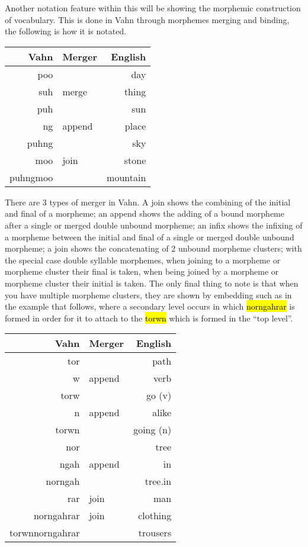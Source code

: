 \documentclass{article}
\newcommand{\hlv}[2][gray]{ {\sethlcolor{#1} \hl{#2}} }
\begin{document}
Another notation feature within this will be showing the morphemic construction of vocabulary. This is done in Vahn through morphemes merging and binding, the following is how it is notated.

\begin{table}[H]
\centering
\begin{tabular}{r|l||r}
Vahn     & Merger & English  \\
\hline\hline
poo      &        & day      \\
suh      & merge  & thing    \\
\hline
puh      &        & sun      \\
ng       & append & place    \\
\hline
puhng    &        & sky      \\
moo      & join   & stone    \\
\hline \hline
puhngmoo &        & mountain
\end{tabular}
\end{table}

There are 3 types of merger in Vahn. A join shows the combining of the initial and final of a morpheme; an append shows the adding of a bound morpheme after a single or merged double unbound morpheme; an infix shows the infixing of a morpheme between the initial and final of a single or merged double unbound morpheme; a join shows the concatenating of 2 unbound morpheme clusters; with the special case double syllable morphemes, when joining to a morpheme or morpheme cluster their final is taken, when being joined by a morpheme or morpheme cluster their initial is taken. The only final thing to note is that when you have multiple morpheme clusters, they are shown by embedding such as in the example that follows, where a secondary level occurs in which \hlv{norngahrar} is formed in order for it to attach to the \hlv{torwn} which is formed in the ``top level''.

\begin{table}[H]
\centering
\begin{tabular}{r|l||r}
Vahn    & Merger     & English     \\
\hline\hline
tor     &            & path        \\
w       & append     & verb        \\
\hline
torw    &            & go (v)      \\
n       & append     & alike       \\
\hline
torwn   &            & going (n)   \\
\hline
\multicolumn{1}{|r|}{nor} && tree \\
\multicolumn{1}{|r|}{ngah} & append & in \\
\hline
\multicolumn{1}{|r|}{norngah} && tree.in \\
\multicolumn{1}{|r|}{rar} & join & man \\
\hline

norngahrar & join    & clothing    \\
\hline\hline
torwnnorngahrar &    & trousers    \\
\end{tabular}
\end{table}
\end{document}
